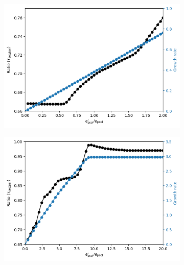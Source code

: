 \begin{figure}[htb!]
  \centering
  \begin{subfigure}[htpb]{0.45\textwidth}
   \centering
   \includegraphics[width=\textwidth]{epool_ec_ratio_gr}
   \caption{
   }
   \label{fig:model-pool-ratio-growthrate}
  \end{subfigure}%
  \begin{subfigure}[htpb]{0.45\textwidth}
   \centering
   \includegraphics[width=\textwidth]{epool_ec_ratio_gr_20}
   \caption{
   }
   \label{fig:model-pool-ratio-growthrate-20}
  \end{subfigure}


\end{figure}
